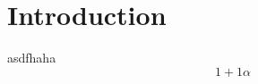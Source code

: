 \documentclass[twocolumn]{article}
\begin{document}
\section{Introduction}


asdfhaha
\begin{equation}
    \label{eq1}
    1+1 \alpha 
\end{equation}
\end{document}
